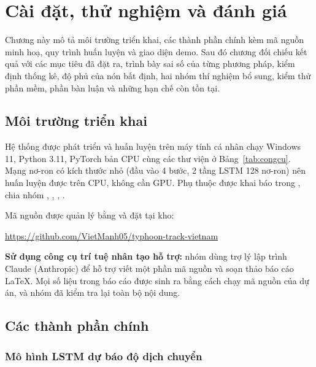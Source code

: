 \chapter{Cài đặt, thử nghiệm và đánh giá}
\label{ch:caidat}
\label{ch:ketqua}

\begin{muctieu}
Chương này mô tả môi trường triển khai, các thành phần chính kèm mã nguồn
minh hoạ, quy trình huấn luyện và giao diện demo. Sau đó chương đối chiếu kết
quả với các mục tiêu đã đặt ra, trình bày sai số của từng phương pháp, kiểm
định thống kê, độ phủ của nón bất định, hai nhóm thí nghiệm bổ sung, kiểm thử
phần mềm, phần bàn luận và những hạn chế còn tồn tại.
\end{muctieu}

\section{Môi trường triển khai}

Hệ thống được phát triển và huấn luyện trên máy tính cá nhân chạy Windows 11,
Python 3.11, PyTorch bản CPU cùng các thư viện ở Bảng~\ref{tab:congcu}. Mạng
nơ-ron có kích thước nhỏ (đầu vào 4 bước, 2 tầng LSTM 128 nơ-ron) nên huấn
luyện được trên CPU, không cần GPU. Phụ thuộc được khai báo trong
, chia nhóm , , ,
.

Mã nguồn được quản lý bằng  và đặt tại kho:
\begin{center}
\url{https://github.com/VietManh05/typhoon-track-vietnam}
\end{center}

\textbf{Sử dụng công cụ trí tuệ nhân tạo hỗ trợ:} nhóm dùng trợ lý lập trình
Claude (Anthropic) để hỗ trợ viết một phần mã nguồn và soạn thảo báo cáo LaTeX.
Mọi số liệu trong báo cáo được sinh ra bằng cách chạy mã nguồn của dự án, và
nhóm đã kiểm tra lại toàn bộ nội dung.

\section{Các thành phần chính}

\subsection{Mô hình LSTM dự báo độ dịch chuyển}

